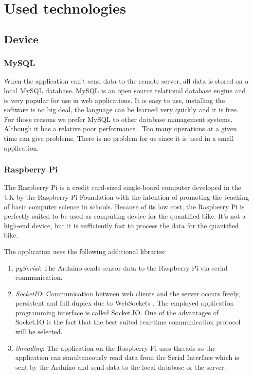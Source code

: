 \section{Used technologies}
\subsection{Device}
\subsubsection{MySQL}
When the application can't send data to the remote server, all data is stored on a local MySQL database. MySQL is an open source relational database engine and is very popular for use in web applications. It is easy to use, installing the software is no big deal, the language can be learned very quickly and it is free. For those reasons we prefer MySQL to other database management systems. Although it has a relative poor performance \cite{MySQLDatarealm}. Too many operations at a given time can give problems. There is no problem for us since it is used in a small application.
\subsubsection{Raspberry Pi}
The Raspberry Pi is a credit card-sized single-board computer developed in the UK by the Raspberry Pi Foundation with the intention of promoting the teaching of basic computer science in schools.\cite{RaspberryWikipedia}
Because of its low cost, the Raspberry Pi is perfectly suited to be used as computing device for the quantified bike. 
It's not a high-end device, but it is sufficiently fast to process the data for the quantified bike.

The application uses the following additional libraries:
\begin{enumerate}
 \item \textit{pySerial}: The Arduino sends sensor data to the Raspberry Pi via serial communication.
 \item \textit{SocketIO}: Communication between web clients and the server occurs freely, persistent and full duplex due to WebSockets \cite{SocketIOKaazing}. The employed application programming interface is called Socket.IO. One of the advantages of Socket.IO is the fact that the best suited real-time communication protocol will be selected. \cite{SocketIOWikipedia}
 \item \textit{threading}: The application on the Raspberry Pi uses threads so the application can simultaneously read data from the Serial Interface which is sent by the Arduino and send data to the local database or the server.
\end{enumerate}

